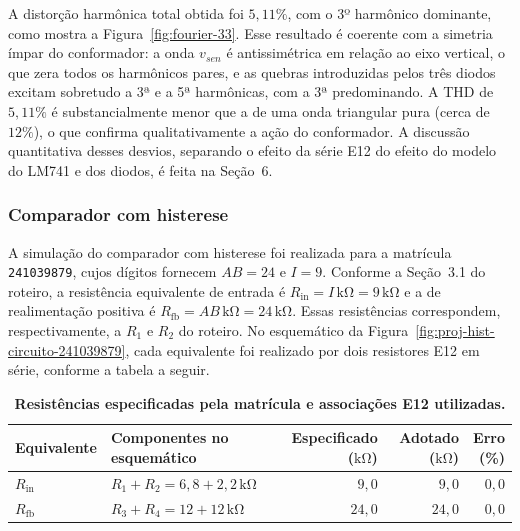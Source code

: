 \documentclass[11pt,a4paper]{article}
\begin{document}
A distorção harmônica total obtida foi \(5{,}11\%\), com o 3º harmônico dominante, como mostra a Figura~\ref{fig:fourier-33}. Esse resultado é coerente com a simetria ímpar do conformador: a onda \(v_{sen}\) é antissimétrica em relação ao eixo vertical, o que zera todos os harmônicos pares, e as quebras introduzidas pelos três diodos excitam sobretudo a 3ª e a 5ª harmônicas, com a 3ª predominando. A THD de \(5{,}11\%\) é substancialmente menor que a de uma onda triangular pura (cerca de \(12\%\)), o que confirma qualitativamente a ação do conformador. A discussão quantitativa desses desvios, separando o efeito da série E12 do efeito do modelo do LM741 e dos diodos, é feita na Seção~6.

\clearpage
\subsubsection{Comparador com histerese}
\label{sec:proj-histerese-241039879}

A simulação do comparador com histerese foi realizada para a matrícula
\texttt{241039879}, cujos dígitos fornecem $AB=24$ e $I=9$. Conforme a
Seção~3.1 do roteiro, a resistência equivalente de entrada é
$R_{\mathrm{in}}=I\,\mathrm{k\Omega}=9\,\mathrm{k\Omega}$ e a de
realimentação positiva é
$R_{\mathrm{fb}}=AB\,\mathrm{k\Omega}=24\,\mathrm{k\Omega}$.
Essas resistências correspondem, respectivamente, a $R_1$ e $R_2$ do
roteiro. No esquemático da Figura~\ref{fig:proj-hist-circuito-241039879},
cada equivalente foi realizado por dois resistores E12 em série, conforme
a tabela a seguir.

\begin{table}[H]
\centering
\caption*{\textbf{Resistências especificadas pela matrícula e associações E12 utilizadas.}}
\small
\begin{tabular}{@{}llrrr@{}}
\toprule
Equivalente & Componentes no esquemático & \shortstack{Especificado\\($\mathrm{k\Omega}$)} & \shortstack{Adotado\\($\mathrm{k\Omega}$)} & \shortstack{Erro\\(\%)} \\
\midrule
$R_{\mathrm{in}}$ & $R_1+R_2=6{,}8+2{,}2\,\mathrm{k\Omega}$ & $9{,}0$ & $9{,}0$ & $0{,}0$ \\
$R_{\mathrm{fb}}$ & $R_3+R_4=12+12\,\mathrm{k\Omega}$ & $24{,}0$ & $24{,}0$ & $0{,}0$ \\
\bottomrule
\end{tabular}
\end{table}
\end{document}
